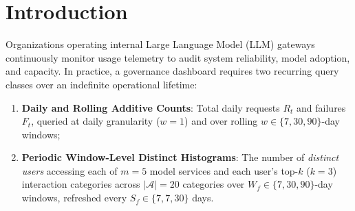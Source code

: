 \documentclass[sigconf, nonacm]{acmart}
\begin{document}
\maketitle
\vldbtopmatter

\section{Introduction}
\label{sec:intro}

Organizations operating internal Large Language Model (LLM) gateways continuously monitor usage telemetry to audit system reliability, model adoption, and capacity. In practice, a governance dashboard requires two recurring query classes over an indefinite operational lifetime:
\begin{enumerate}[leftmargin=*, nosep, topsep=2pt]
    \item \textbf{Daily and Rolling Additive Counts}: Total daily requests $R_t$ and failures $F_t$, queried at daily granularity ($w=1$) and over rolling $w \in \{7, 30, 90\}$-day windows;
    \item \textbf{Periodic Window-Level Distinct Histograms}: The number of \emph{distinct users} accessing each of $m=5$ model services and each user's top-$k$ ($k=3$) interaction categories across $|\mathcal{A}|=20$ categories over $W_f \in \{7, 30, 90\}$-day windows, refreshed every $S_f \in \{7, 7, 30\}$ days.
\end{enumerate}
\end{document}
